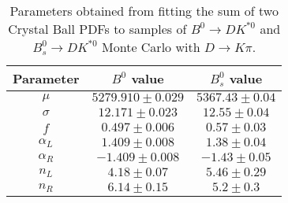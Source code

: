 \begin{table}[h]
  \centering
  \begin{tabular}{ccc}
      \toprule
      Parameter & $B^0$ value & $B^0_s$ value \\
      \midrule
      $\mu$ & $5279.910 \pm 0.029$ & $5367.43 \pm 0.04$ \\
      $\sigma$ & $12.171 \pm 0.023$ & $12.55 \pm 0.04$ \\
      $f$ & $0.497 \pm 0.006$ & $0.57 \pm 0.03$ \\
      $\alpha_L$ & $1.409 \pm 0.008$ & $1.38 \pm 0.04$ \\
      $\alpha_R$ & $-1.409 \pm 0.008$ & $-1.43 \pm 0.05$ \\
      $n_L$ & $4.18 \pm 0.07$ & $5.46 \pm 0.29$ \\
      $n_R$ & $6.14 \pm 0.15$ & $5.2 \pm 0.3$ \\
  \bottomrule
  \end{tabular}
  \caption{Parameters obtained from fitting the sum of two Crystal Ball PDFs to samples of $B^0 \to DK^{*0}$ and $B^0_s \to DK^{*0}$ Monte Carlo  with $D \to K\pi$.}
\label{tab:signal_MC_params}
\end{table}
